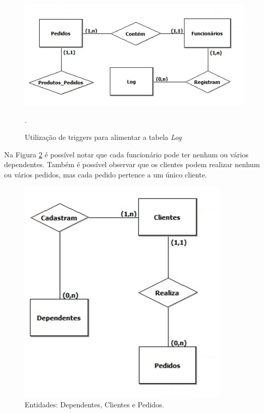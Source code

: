 \documentclass[
	12pt,				%
	openright,			%
	oneside,			%
	a4paper,			%
	chapter=TITLE,		%
	section=TITLE,		%
	english,			%
	brazil				%
	]{abntex2}
\begin{document}
    \begin{figure}[h]
         \centering
         \includegraphics[width=15cm,keepaspectratio]{Imgs/MC_01}
         \caption{Utilização de triggers para alimentar a tabela \textit{Log}}.
         \label{mc01}
    \end{figure}    

    \newpage
    
    Na Figura \ref{mc_02} é possível notar que cada funcionário pode ter
    nenhum ou vários dependentes. Também é possível observar que os clientes podem 
    realizar nenhum ou vários pedidos, mas cada pedido pertence a um único cliente.
    \begin{figure}[h]
         \centering
         \includegraphics[width=10cm,keepaspectratio]{Imgs/MC_02}
         \caption{Entidades: Dependentes, Clientes e Pedidos.}
         \label{mc_02}
    \end{figure}

    \newpage
\end{document}
